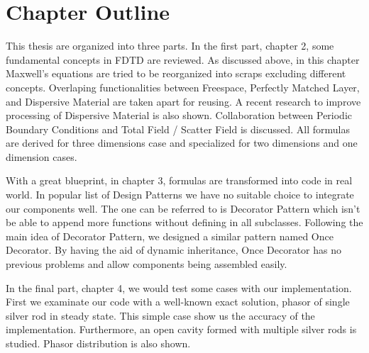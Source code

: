 \section{Chapter Outline}
This thesis are organized into three parts. In the first part, chapter 2, some fundamental concepts in FDTD are
reviewed. As discussed above, in this chapter Maxwell's equations are tried to be reorganized into scraps excluding
different concepts. Overlaping functionalities between Freespace, Perfectly Matched Layer, and Dispersive Material are
taken apart for reusing. A recent research to improve processing of Dispersive Material is also shown. Collaboration
between Periodic Boundary Conditions and Total Field / Scatter Field is discussed. All formulas are derived for three
dimensions case and specialized for two dimensions and one dimension cases.

With a great blueprint, in chapter 3, formulas are transformed into code in real world. In popular list of Design
Patterns we have no suitable choice to integrate our components well. The one can be referred to is Decorator Pattern
which isn't be able to append more functions without defining in all subclasses. Following the main idea of Decorator
Pattern, we designed a similar pattern named Once Decorator. By having the aid of dynamic inheritance, Once Decorator
has no previous problems and allow components being assembled easily.

In the final part, chapter 4, we would test some cases with our implementation. First we examinate our code with a
well-known exact solution, phasor of single silver rod in steady state. This simple case show us the accuracy of the
implementation. Furthermore, an open cavity formed with multiple silver rods is studied. Phasor distribution is also
shown.

